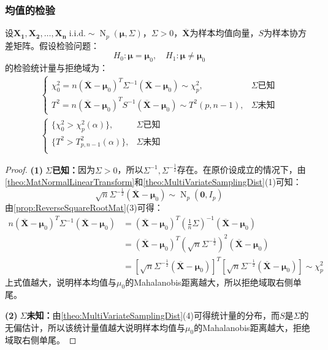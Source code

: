 \subsubsection{均值的检验}
\begin{theorem}
	设$\mathbf{X_1},\mathbf{X_2},\dots,\mathbf{X_n}\;\text{i.i.d.}\sim\operatorname{N}_p(\boldsymbol{\mu},\Sigma)$，$\Sigma>0$，$\overline{\mathbf{X}}$为样本均值向量，$S$为样本协方差矩阵。假设检验问题：
	\begin{equation*}
		H_0:\boldsymbol{\mu}=\boldsymbol{\mu}_0,\quad H_1:\boldsymbol{\mu}\ne\boldsymbol{\mu}_0
	\end{equation*}
	的检验统计量与拒绝域为：
	\begin{gather*}
		\begin{cases}
			\chi_0^2=n(\overline{\mathbf{X}}-\boldsymbol{\mu}_0)^T\Sigma^{-1}(\overline{\mathbf{X}}-\boldsymbol{\mu}_0)\sim\chi_p^2,&\Sigma\text{已知} \\
			T^2=n(\overline{\mathbf{X}}-\boldsymbol{\mu}_0)^TS^{-1}(\overline{\mathbf{X}}-\boldsymbol{\mu}_0)\sim T^2(p,n-1),&\Sigma\text{未知}
		\end{cases} \\
		\begin{cases}
			\{\chi_0^2>\chi_p^2(\alpha)\},&\Sigma\text{已知} \\
			\{T^2>T^2_{p,n-1}(\alpha)\},&\Sigma\text{未知} \\
		\end{cases}
	\end{gather*}
\end{theorem}
\begin{proof}
	\textbf{(1)$\;\Sigma$已知：}因为$\Sigma>0$，所以$\Sigma^{-1},\Sigma^{-\frac{1}{2}}$存在。在原价设成立的情况下，由\cref{theo:MatNormalLinearTransform}和\cref{theo:MultiVariateSamplingDist}(1)可知：
	\begin{equation*}
		\sqrt{n}\Sigma^{-\frac{1}{2}}(\overline{\mathbf{X}}-\boldsymbol{\mu}_0)\sim\operatorname{N}_p(\mathbf{0},I_p)
	\end{equation*}
	由\cref{prop:ReverseSquareRootMat}(3)可得：
	\begin{align*}
		n(\overline{\mathbf{X}}-\boldsymbol{\mu}_0)^T\Sigma^{-1}(\overline{\mathbf{X}}-\boldsymbol{\mu}_0)
		&=(\overline{\mathbf{X}}-\boldsymbol{\mu}_0)^T\left(\frac{1}{n}\Sigma\right)^{-1}(\overline{\mathbf{X}}-\boldsymbol{\mu}_0) \\
		&=(\overline{\mathbf{X}}-\boldsymbol{\mu}_0)^T\left(\sqrt{n}\Sigma^{-\frac{1}{2}}\right)^{2}(\overline{\mathbf{X}}-\boldsymbol{\mu}_0) \\
		&=[\sqrt{n}\Sigma^{-\frac{1}{2}}(\overline{\mathbf{X}}-\boldsymbol{\mu}_0)]^T[\sqrt{n}\Sigma^{-\frac{1}{2}}(\overline{\mathbf{X}}-\boldsymbol{\mu}_0)]\sim\chi^2_p
	\end{align*}
	上式值越大，说明样本均值与$\mu_0$的Mahalanobis距离越大，所以拒绝域取右侧单尾。\par
	\textbf{(2)$\;\Sigma$未知：}由\cref{theo:MultiVariateSamplingDist}(4)可得统计量的分布，而$S$是$\Sigma$的无偏估计，所以该统计量值越大说明样本均值与$\mu_0$的Mahalanobis距离越大，拒绝域取右侧单尾。
\end{proof}
